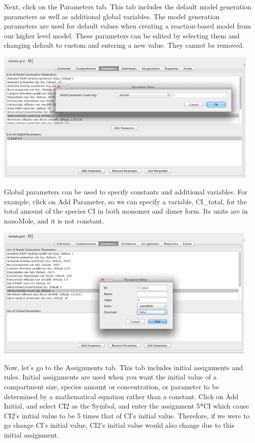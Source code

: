\documentclass[titlepage,11pt]{article}
\begin{document}
Next, click on the Parameters tab.  This tab includes the default model generation parameters as well as additional global variables.  The model generation parameters are used for default values when creating a reaction-based model from our higher level model.  These parameters can be edited by selecting them and changing default to custom and entering a new value.  They cannot be removed.

\begin{center}
\includegraphics[height=65mm]{screenshots/GCMparam}
\end{center}

Global parameters can be used to specify constants and additional variables.  For example, click on Add Parameter, so we can specify a variable, CI\_total, for the total amount of the species CI in both monomer and dimer form.  Its units are in nanoMole, and it is not constant.

\begin{center}
\includegraphics[height=65mm]{screenshots/parameter}
\end{center}

Now, let's go to the Assignments tab.  This tab includes initial assignments and rules.  Initial assignments are used when you want the initial value of a compartment size, species amount or concentration, or parameter to be determined by a mathematical equation rather than a constant.  Click on Add Initial, and select CI2 as the Symbol, and enter the assignment 5*CI which cause CI2's initial value to be 5 times that of CI's initial value.  Therefore, if we were to go change CI's initial value, CI2's initial value would also change due to this initial assignment.
\end{document}
